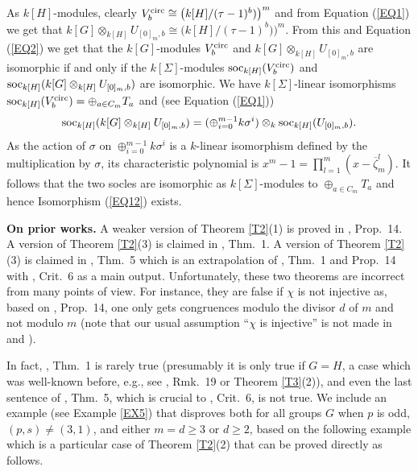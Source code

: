 \documentclass[11pt]{amsart}
\def\circul{\textup{circ}}
\def\soc{\textup{soc}}
\begin{document}
As $k[H]$-modules, clearly $V_b^{\circul}\cong \bigl(k[H]/(\tau-1)^b)\bigr)^m$ and from Equation (\ref{EQ1}) we get that $k[G]\otimes_{k[H]} U_{[0]_m,b}\cong\bigl(k[H]/(\tau-1)^b)\bigr)^m$. From this and Equation (\ref{EQ2}) we get that the $k[G]$-modules $V_b^{\circul}$ and $k[G]\otimes_{k[H]} U_{[0]_m,b}$ are isomorphic if and only if the $k[\Sigma]$-modules $\soc_{k[H]}(V_b^{\circul})$ and $\soc_{k[H]}(k[G]\otimes_{k[H]} U_{[0]_m,b})$ are isomorphic. We have $k[\Sigma]$-linear isomorphisms $\soc_{k[H]}(V_b^{\circul})=\oplus_{a\in C_m} T_a$ and (see Equation (\ref{EQ1}))
$$\soc_{k[H]}(k[G]\otimes_{k[H]} U_{[0]_m,b})=(\oplus_{i=0}^{m-1} k\sigma^i)\otimes_k \soc_{k[H]}(U_{[0]_m,b}).$$
As the action of $\sigma$ on $\oplus_{i=0}^{m-1} k\sigma^i$ is a $k$-linear isomorphism defined by the multiplication by $\sigma$, its characteristic polynomial is $x^m-1=\prod_{l=1}^m (x-\overline{\zeta}_m^l)$. It follows that the two socles are isomorphic as $k[\Sigma]$-modules to $\oplus_{a\in C_m} T_a$ and hence Isomorphism (\ref{EQ12}) exists.

{\bf On prior works.} A weaker version of Theorem \ref{T2}(1) is proved in \cite{KT1}, Prop.\ 14. A version of  Theorem \ref{T2}(3) is claimed in \cite{KT1}, Thm.\ 1. A version of Theorem \ref{T2}(3) is claimed in \cite{KT2}, Thm.\ 5 which is an extrapolation of \cite{KT1}, Thm.\ 1 and Prop.\ 14 with \cite{KT2}, Crit.\ 6 as a main output. Unfortunately, these two theorems are incorrect from many points of view. For instance, they are false if $\chi$ is not injective as, based on \cite{KT1}, Prop.\ 14, one only gets congruences modulo the divisor $d$ of $m$ and not modulo $m$ (note that our usual assumption ``$\chi$ is injective'' is not made in \cite{KT1} and \cite{KT2}).

In fact, \cite{KT1}, Thm.\ 1 is rarely true (presumably it is only true if $G=H$, a case which was well-known before, e.g., see \cite{KT1}, Rmk.\ 19 or Theorem \ref{T3}(2)), and even the last sentence of \cite{KT2}, Thm.\ 5, which is crucial to \cite{KT2}, Crit.\ 6, is not true. We include an example (see Example \ref{EX5}) that disproves both for all groups $G$ when $p$ is odd, $(p,s)\neq (3,1)$, and either $m=d\ge 3$ or $d\ge 2$, based on the following example which is a particular case of Theorem \ref{T2}(2) that can be proved directly as follows.
\end{document}
